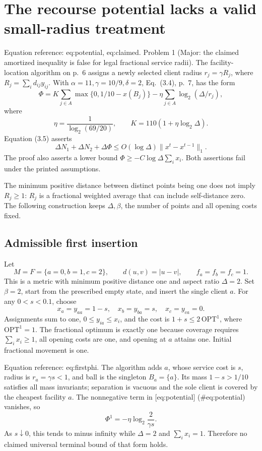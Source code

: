 \documentclass[10pt]{article}
\begin{document}
\section*{The recourse potential lacks a valid small-radius treatment}
Equation reference: eq:potential, eq:claimed. Problem 1 (Major: the claimed amortized inequality is false for legal fractional service radii).  The facility-location algorithm on p. 6 assigns a newly selected client radius \(r_j=\gamma R_j\), where \(R_j=\sum_i d_{ij}y_{ij}\). With \(\alpha=11,\gamma=10/9,\delta=2\), Eq. (3.4), p. 7, has the form \[
\Phi=K\sum_{j\in A}\max\{0,1/10-x(B_j)\}
-\eta\sum_{j\in A}\log_2(\Delta/r_j),\] where \[\eta=\frac1{\log_2(69/20)},\qquad
K=110(1+\eta\log_2\Delta).\] Equation (3.5) asserts \[
\Delta N_1+\Delta N_2+\Delta\Phi
\le O(\log\Delta)\|x^t-x^{t-1}\|_1.\] The proof also asserts a lower bound \(\Phi\ge-C\log\Delta\sum_i x_i\). Both assertions fail under the printed assumptions.\par
The minimum positive distance between distinct points being one does not imply \(R_j\ge1\): \(R_j\) is a fractional weighted average that can include self-distance zero. The following construction keeps \(\Delta,\beta\), the number of points and all opening costs fixed.\par
\subsection*{Admissible first insertion}
Let \[M=F=\{a=0,b=1,c=2\},\qquad d(u,v)=|u-v|,\qquad f_a=f_b=f_c=1.\] This is a metric with minimum positive distance one and aspect ratio \(\Delta=2\). Set \(\beta=2\), start from the prescribed empty state, and insert the single client \(a\). For any \(0<s<0.1\), choose \[x_a=y_{aa}=1-s,\quad x_b=y_{ba}=s,\quad x_c=y_{ca}=0.\] Assignments sum to one, \(0\le y_{ia}\le x_i\), and the cost is \(1+s\le2\,\mathrm{OPT}^1\), where \(\mathrm{OPT}^1=1\). The fractional optimum is exactly one because coverage requires \(\sum_i x_i\ge1\), all opening costs are one, and opening at \(a\) attains one. Initial fractional movement is one.\par
Equation reference: eq:firstphi. The algorithm adds \(a\), whose service cost is \(s\), radius is \(r_a=\gamma s<1\), and ball is the singleton \(B_a=\{a\}\). Its mass \(1-s>1/10\) satisfies all mass invariants; separation is vacuous and the sole client is covered by the cheapest facility \(a\). The nonnegative term in [eq:potential] (\#eq:potential) vanishes, so \[
\Phi^1=-\eta\log_2\frac{2}{\gamma s}.\] As \(s\downarrow0\), this tends to minus infinity while \(\Delta=2\) and \(\sum_i x_i=1\). Therefore no claimed universal terminal bound of that form holds.\par
\end{document}
